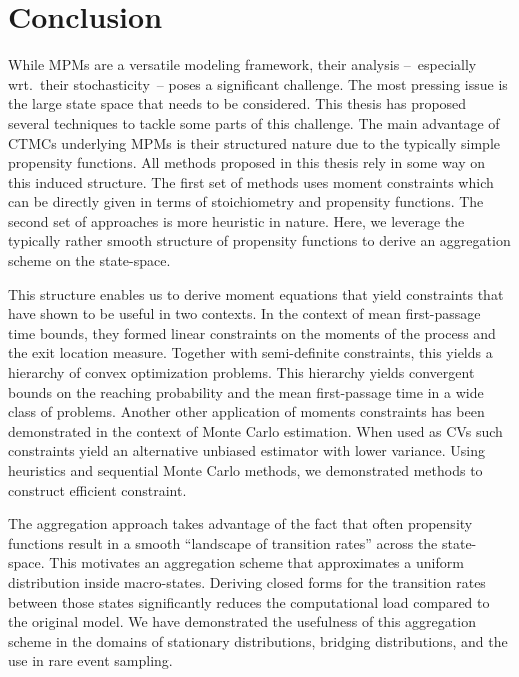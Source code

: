 \chapter{Conclusion}
While \aclp{MPM} are a versatile modeling framework, their analysis --~especially wrt.\ their stochasticity~-- poses a significant challenge.
The most pressing issue is the large state space that needs to be considered.
This thesis has proposed several techniques to tackle some parts of this challenge.
The main advantage of \acp{CTMC} underlying \acp{MPM} is their structured nature due to the typically simple propensity functions.
All methods proposed in this thesis rely in some way on this induced structure.
The first set of methods uses moment constraints which can be directly given in terms of stoichiometry and propensity functions.
The second set of approaches is more heuristic in nature.
Here, we leverage the typically rather smooth structure of propensity functions to derive an aggregation scheme on the state-space.

This structure enables us to derive moment equations that yield constraints that have shown to be useful in two contexts.
In the context of mean first-passage time bounds, they formed linear constraints on the moments of the process and the exit location measure.
Together with semi-definite constraints, this yields a hierarchy of convex optimization problems.
This hierarchy yields convergent bounds on the reaching probability and the mean first-passage time in a wide class of problems.
Another other application of moments constraints has been demonstrated in the context of Monte Carlo estimation.
When used as \aclp{CV} such constraints yield an alternative unbiased estimator with lower variance.
Using heuristics and sequential Monte Carlo methods, we demonstrated methods to construct efficient constraint.

The aggregation approach takes advantage of the fact that often propensity functions result in a smooth ``landscape of transition rates'' across the state-space.
This motivates an aggregation scheme that approximates a uniform distribution inside macro-states.
Deriving closed forms for the transition rates between those states significantly reduces the computational load compared to the original model.
We have demonstrated the usefulness of this aggregation scheme in the domains of stationary distributions, bridging distributions, and the use in rare event sampling.


